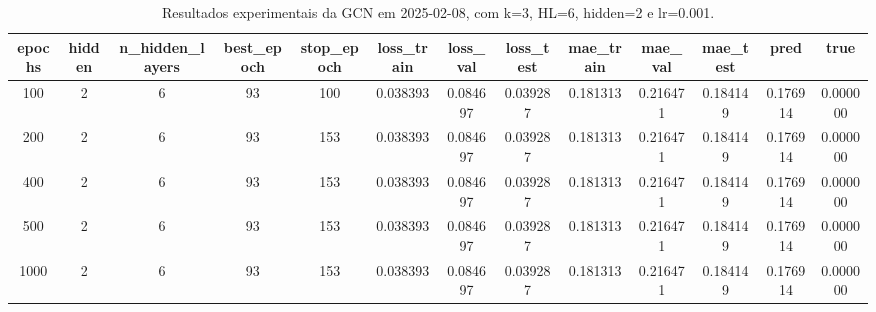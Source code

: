 \begin{table}[h]
\centering
\caption{Resultados experimentais da GCN em 2025-02-08, com k=3, HL=6, hidden=2 e lr=0.001.}
\label{tab:gcn_results_k3_hl6_h2_d20250208}
\begin{tabular}{ccccccccccccc}
\toprule
epochs & hidden & n\_hidden\_layers & best\_epoch & stop\_epoch & loss\_train & loss\_val & loss\_test & mae\_train & mae\_val & mae\_test & pred & true \\
\midrule
100 & 2 & 6 & 93 & 100 & 0.038393 & 0.084697 & 0.039287 & 0.181313 & 0.216471 & 0.184149 & 0.176914 & 0.000000 \\
200 & 2 & 6 & 93 & 153 & 0.038393 & 0.084697 & 0.039287 & 0.181313 & 0.216471 & 0.184149 & 0.176914 & 0.000000 \\
400 & 2 & 6 & 93 & 153 & 0.038393 & 0.084697 & 0.039287 & 0.181313 & 0.216471 & 0.184149 & 0.176914 & 0.000000 \\
500 & 2 & 6 & 93 & 153 & 0.038393 & 0.084697 & 0.039287 & 0.181313 & 0.216471 & 0.184149 & 0.176914 & 0.000000 \\
1000 & 2 & 6 & 93 & 153 & 0.038393 & 0.084697 & 0.039287 & 0.181313 & 0.216471 & 0.184149 & 0.176914 & 0.000000 \\
\bottomrule
\end{tabular}
\end{table}
